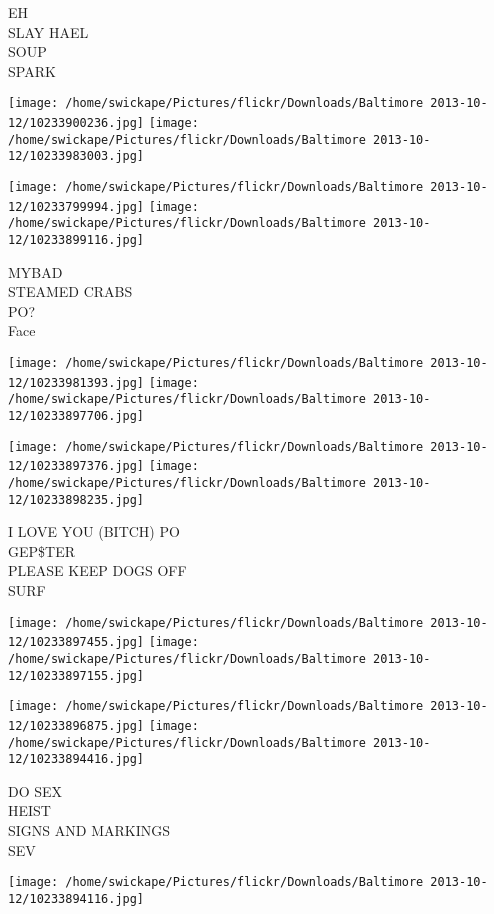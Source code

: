 \documentclass[10pt,letterpaper]{article}
\begin{document}
EH\\
SLAY HAEL\\
SOUP\\
SPARK
\pagebreak

\texttt{[image: /home/swickape/Pictures/flickr/Downloads/Baltimore 2013-10-12/10233900236.jpg]}
\texttt{[image: /home/swickape/Pictures/flickr/Downloads/Baltimore 2013-10-12/10233983003.jpg]}

\texttt{[image: /home/swickape/Pictures/flickr/Downloads/Baltimore 2013-10-12/10233799994.jpg]}
\texttt{[image: /home/swickape/Pictures/flickr/Downloads/Baltimore 2013-10-12/10233899116.jpg]}

MYBAD\\
STEAMED CRABS\\
PO?\\
Face
\pagebreak

\texttt{[image: /home/swickape/Pictures/flickr/Downloads/Baltimore 2013-10-12/10233981393.jpg]}
\texttt{[image: /home/swickape/Pictures/flickr/Downloads/Baltimore 2013-10-12/10233897706.jpg]}

\texttt{[image: /home/swickape/Pictures/flickr/Downloads/Baltimore 2013-10-12/10233897376.jpg]}
\texttt{[image: /home/swickape/Pictures/flickr/Downloads/Baltimore 2013-10-12/10233898235.jpg]}

I LOVE YOU (BITCH) PO\\
GEP\$TER\\
PLEASE KEEP DOGS OFF\\
SURF
\pagebreak

\texttt{[image: /home/swickape/Pictures/flickr/Downloads/Baltimore 2013-10-12/10233897455.jpg]}
\texttt{[image: /home/swickape/Pictures/flickr/Downloads/Baltimore 2013-10-12/10233897155.jpg]}

\texttt{[image: /home/swickape/Pictures/flickr/Downloads/Baltimore 2013-10-12/10233896875.jpg]}
\texttt{[image: /home/swickape/Pictures/flickr/Downloads/Baltimore 2013-10-12/10233894416.jpg]}

DO SEX\\
HEIST\\
SIGNS AND MARKINGS\\
SEV
\pagebreak

\texttt{[image: /home/swickape/Pictures/flickr/Downloads/Baltimore 2013-10-12/10233894116.jpg]}
\end{document}
